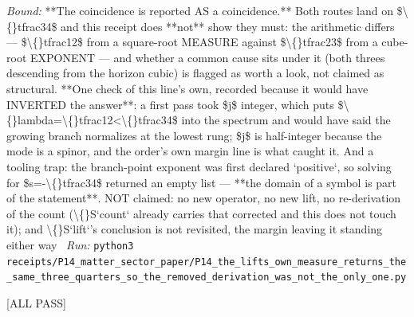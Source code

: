\begin{description}
 \emph{Bound:}  **The coincidence is reported AS a coincidence.** Both routes land on \$\textbackslash\{\}tfrac34\$ and this receipt does **not** show they must: the arithmetic differs --- \$\textbackslash\{\}tfrac12\$ from a square-root MEASURE against \$\textbackslash\{\}tfrac23\$ from a cube-root EXPONENT --- and whether a common cause sits under it (both threes descending from the horizon cubic) is flagged as worth a look, not claimed as structural.  **One check of this line's own, recorded because it would have INVERTED the answer**: a first pass took \$j\$ integer, which puts \$\textbackslash\{\}lambda=\textbackslash\{\}tfrac12<\textbackslash\{\}tfrac34\$ into the spectrum and would have said the growing branch normalizes at the lowest rung; \$j\$ is half-integer because the mode is a spinor, and the order's own margin line is what caught it.  And a tooling trap: the branch-point exponent was first declared `positive`, so solving for \$s=-\textbackslash\{\}tfrac34\$ returned an empty list --- **the domain of a symbol is part of the statement**.  NOT claimed: no new operator, no new lift, no re-derivation of the count (\textbackslash\{\}S`count` already carries that corrected and this does not touch it); and \textbackslash\{\}S`lift`'s conclusion is not revisited, the margin leaving it standing either way
\ \emph{Run:} \texttt{python3 receipts/P14\_matter\_sector\_paper/P14\_the\_lifts\_own\_measure\_returns\_the\_same\_three\_quarters\_so\_the\_removed\_derivation\_was\_not\_the\_only\_one.py}
\item[\rcptlabel{P14_the_leaf_measure_closes_completeness_by_a_different_theorem}{P14R95}\textbf{P14R95}\quad\texttt{P14\_the\_leaf\_measure\_closes\_completeness\_by\_a\_different\_theorem}]\hfill\textsf{[ALL PASS]}\\

\end{description}
